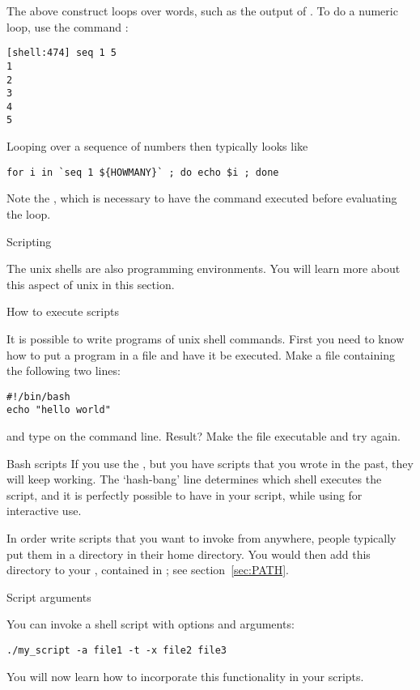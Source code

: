 The above construct loops over words, such as the output of
. To do a numeric loop, use the command :
\begin{lstlisting}
[shell:474] seq 1 5
1
2
3
4
5
\end{lstlisting}
Looping over a sequence of numbers then typically looks like
\begin{lstlisting}
for i in `seq 1 ${HOWMANY}` ; do echo $i ; done
\end{lstlisting}
Note the , which is necessary to have the 
command executed before evaluating the loop.

 {Scripting}
\label{sec:unix-script}

The unix shells are also programming environments. You will learn more
about this aspect of unix in this section.

 {How to execute scripts}
\label{sec:shell-scripting}

It is possible to write programs of unix shell commands. First you
need to know how to put a program in a file and have it be
executed. Make a file  containing the following two lines:
\begin{lstlisting}
#!/bin/bash
echo "hello world"
\end{lstlisting}
and type  on the command line. Result?
Make the file executable and try again.

\begin{zshnote}{Bash scripts}
  If you use the , but you have  scripts
  that you wrote in the past, they will keep working.
  The `hash-bang' line determines which shell executes the script,
  and it is perfectly possible to have  in your script,
  while using  for interactive use.
\end{zshnote}

In order write scripts that you want to invoke from anywhere, people
typically put them in a directory  in their home directory.
You would then add this directory to your ,
contained in ; see section~\ref{sec:PATH}.

 {Script arguments}

You can invoke a shell script with options and arguments:
\begin{lstlisting}
./my_script -a file1 -t -x file2 file3
\end{lstlisting}

You will now learn how to incorporate this functionality in your scripts.

